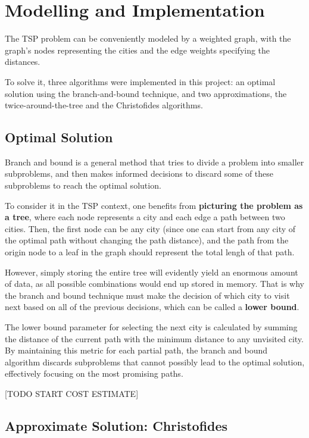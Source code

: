 \documentclass[12pt]{article}
\begin{document}
\section{Modelling and Implementation} \label{sec:model}

The TSP problem can be conveniently modeled by a weighted graph, with the graph's 
nodes representing the cities and the edge weights specifying the distances.

To solve it, three algorithms were implemented in this project: an optimal solution using 
the branch-and-bound technique, and two approximations, the twice-around-the-tree and the 
Christofides algorithms.

\subsection{Optimal Solution} \label{sec:optimal_explanation}

Branch and bound is a general method that tries to divide a problem into smaller subproblems,
and then makes informed decisions to discard some of these subproblems to reach the optimal solution.

To consider it in the TSP context, one benefits from \textbf{picturing the problem as a tree}, where each node 
represents a city and each edge a path between two cities. Then, the first node can be any city 
(since one can start from any city of the optimal path without changing the path distance), and 
the path from the origin node to a leaf in the graph should represent the total 
lengh of that path.

However, simply storing the entire tree will evidently yield an enormous amount 
of data, as all possible combinations would end up stored in memory. That is why the 
branch and bound technique must make the decision of which city to visit next based 
on all of the previous decisions, which can be called a \textbf{lower bound}.

The lower bound parameter for selecting the next city is calculated by summing the 
distance of the current path with the minimum distance to any unvisited city. By 
maintaining this metric for each partial path, the branch and bound algorithm 
discards subproblems that cannot possibly lead to the optimal solution, effectively 
focusing on the most promising paths.

[TODO START COST ESTIMATE]

\subsection{Approximate Solution: Christofides} \label{sec:chris_explanation}
\end{document}
